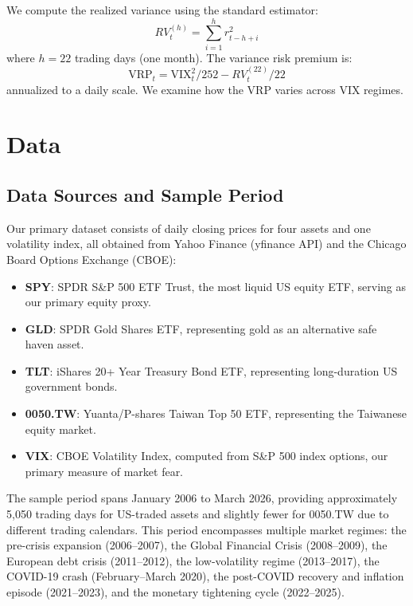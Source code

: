 \documentclass[12pt,a4paper]{article}
\begin{document}
We compute the realized variance using the standard estimator:
\begin{equation}
RV_t^{(h)} = \sum_{i=1}^{h} r_{t-h+i}^2
\label{eq:rv}
\end{equation}
where $h = 22$ trading days (one month). The variance risk premium is:
\begin{equation}
\text{VRP}_t = \text{VIX}_t^2 / 252 - RV_t^{(22)} / 22
\label{eq:vrp}
\end{equation}
annualized to a daily scale. We examine how the VRP varies across VIX regimes.


\section{Data}
\label{sec:data}

\subsection{Data Sources and Sample Period}

Our primary dataset consists of daily closing prices for four assets and one volatility index, all obtained from Yahoo Finance (yfinance API) and the Chicago Board Options Exchange (CBOE):

\begin{itemize}
    \item \textbf{SPY}: SPDR S\&P 500 ETF Trust, the most liquid US equity ETF, serving as our primary equity proxy.
    \item \textbf{GLD}: SPDR Gold Shares ETF, representing gold as an alternative safe haven asset.
    \item \textbf{TLT}: iShares 20+ Year Treasury Bond ETF, representing long-duration US government bonds.
    \item \textbf{0050.TW}: Yuanta/P-shares Taiwan Top 50 ETF, representing the Taiwanese equity market.
    \item \textbf{VIX}: CBOE Volatility Index, computed from S\&P 500 index options, our primary measure of market fear.
\end{itemize}

The sample period spans January 2006 to March 2026, providing approximately 5,050 trading days for US-traded assets and slightly fewer for 0050.TW due to different trading calendars. This period encompasses multiple market regimes: the pre-crisis expansion (2006--2007), the Global Financial Crisis (2008--2009), the European debt crisis (2011--2012), the low-volatility regime (2013--2017), the COVID-19 crash (February--March 2020), the post-COVID recovery and inflation episode (2021--2023), and the monetary tightening cycle (2022--2025).
\end{document}
